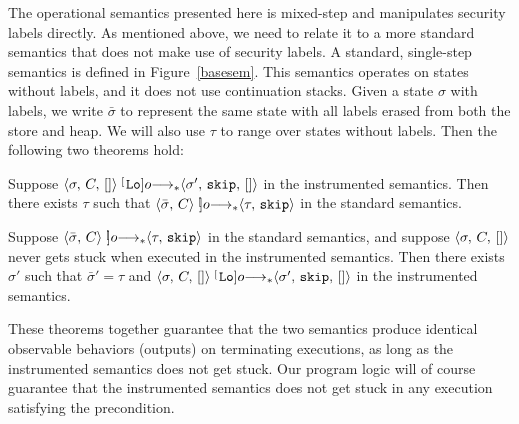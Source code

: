 The operational semantics presented here is mixed-step and manipulates security labels directly. 
As mentioned above, we need to relate it to a more standard semantics that does not make
use of security labels. A standard, single-step semantics is defined in Figure~\ref{basesem}. 
This semantics operates on states without labels,
and it does not use continuation stacks. Given a state $\sigma$ with labels, we write $\bar{\sigma}$ to represent 
the same state with all labels erased from both the store and heap. We will also use $\tau$ to range over states 
without labels. Then the following two theorems hold:

\begin{thm}
Suppose $\langle \sigma, \, C, \, [] \rangle \stackrel[\!\!\text{\tt{Lo}}]{o}{\longrightarrow_{*}} \langle \sigma', \, \text{\tt{skip}}, \, [] \rangle$ in the instrumented
semantics. Then there exists $\tau$ such that $\langle \bar{\sigma}, \, C \rangle \stackrel[\!\!]{o}{\longrightarrow_{*}} \langle \tau, \, \text{\tt{skip}} \rangle$ 
in the standard semantics.
\end{thm}

\begin{thm}
Suppose $\langle \bar{\sigma}, \, C \rangle \stackrel[\!\!]{o}{\longrightarrow_{*}} \langle \tau, \, \text{\tt{skip}} \rangle$ in the standard semantics, and suppose
$\langle \sigma, \, C, \, [] \rangle$ never gets stuck when executed in the instrumented semantics. Then 
there exists $\sigma'$ such that $\bar{\sigma}' = \tau$ and
$\langle \sigma, \, C, \, [] \rangle \stackrel[\!\!\text{\tt{Lo}}]{o}{\longrightarrow_{*}} \langle \sigma', \, \text{\tt{skip}}, \, [] \rangle$ in the instrumented semantics.
\end{thm}

These theorems together guarantee that the two semantics produce identical observable behaviors (outputs)
on terminating executions, as long as the instrumented semantics does not get stuck. Our program logic will
of course guarantee that the instrumented semantics does not get stuck in any execution satisfying the precondition.

\begin{comment}
\begin{figure}
\begin{alltt}
// Assumption: Alice's calendar is a 64-element 
// array beginning at location A

1  i := 0;
2  while (i < 64) do
3      x := isFree(i);
4      if (x = true)
5          then 
6              output i
7          else 
8              skip;
9      i := i+1

10 isFree(i):
11     x := [A+i];
12     if (x = 0)
13         then
14             y := true;
15         else
16             y := false;
17     return y
\end{alltt}
\caption{Example: Alice's Private Calendar}
\label{calexample}
\end{figure}
\end{comment}




